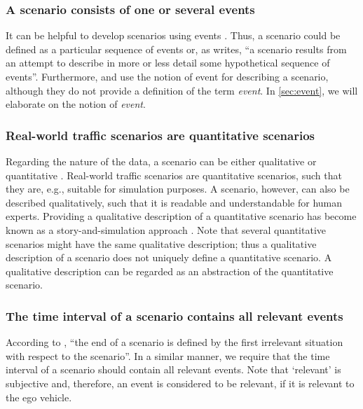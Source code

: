 \subsubsection{A scenario consists of one or several events \cite{vannotten2003updated, go2004blind, geyer2014, ulbrich2015, kahn1962, englund2016grand, schoemaker1993multiple, cuppens2002alert, bach2016modelbased}}
It can be helpful to develop scenarios using events \cite{bishop2007scentechniques}. Thus, a scenario could be defined as a particular sequence of events or, as \textcite[p.~143]{kahn1962} writes, ``a scenario results from an attempt to describe in more or less detail some hypothetical sequence of events''. Furthermore, \textcite{geyer2014} and \textcite{ulbrich2015} use the notion of event for describing a scenario, although they do not provide a definition of the term \emph{event}. In \cref{sec:event}, we will elaborate on the notion of \emph{event}.

\subsubsection{Real-world traffic scenarios are quantitative scenarios}
Regarding the nature of the data, a scenario can be either qualitative or quantitative \cite{vannotten2003updated}. Real-world traffic scenarios are quantitative scenarios, such that they are, e.g., suitable for simulation purposes. A scenario, however, can also be described qualitatively, such that it is readable and understandable for human experts. Providing a qualitative description of a quantitative scenario has become known as a story-and-simulation approach \cite{alcamo2001scenarios}. Note that several quantitative scenarios might have the same qualitative description; thus a qualitative description of a scenario does not uniquely define a quantitative scenario. A qualitative description can be regarded as an abstraction of the quantitative scenario.

\subsubsection{The time interval of a scenario contains all relevant events}
According to \textcite{geyer2014}, ``the end of a scenario is defined by the first irrelevant situation with respect to the scenario''. In a similar manner, we require that the time interval of a scenario should contain all relevant events. Note that `relevant' is subjective and, therefore, an event is considered to be relevant, if it is relevant to the ego vehicle.


